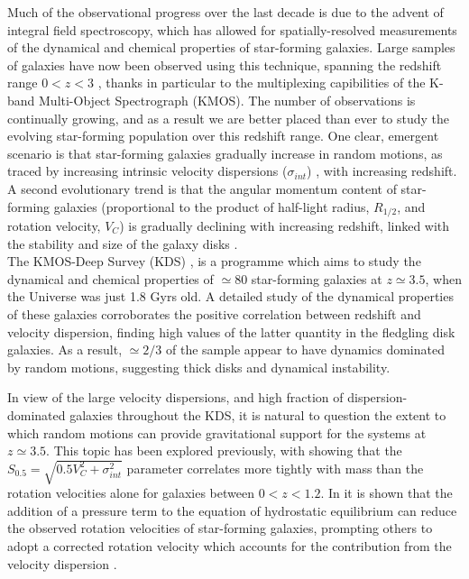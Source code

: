 \documentclass[fleqn,usenatbib]{mnras}
\begin{document}
\noindent
Much of the observational progress over the last decade is due to the advent of integral field spectroscopy, which has allowed for spatially-resolved measurements of the dynamical and chemical properties of star-forming galaxies.
Large samples of galaxies have now been observed using this technique, spanning the redshift range $0 < z < 3$ \citep[e.g.][]{Epinat2008a,ForsterSchreiber2009,Gnerucci2011,Epinat2012,Wisnioski2015,Stott2016,Swinbank2017}, thanks in particular to the multiplexing capibilities of the K-band Multi-Object Spectrograph (KMOS).
The number of observations is continually growing, and as a result we are better placed than ever to study the evolving star-forming population over this redshift range.
One clear, emergent scenario is that star-forming galaxies gradually increase in random motions, as traced by increasing intrinsic velocity dispersions ($\sigma_{int}$) \citep[e.g.][]{Wisnioski2015}, with increasing redshift.
A second evolutionary trend is that the angular momentum content of star-forming galaxies (proportional to the product of half-light radius, $R_{1/2}$, and rotation velocity, $V_{C}$) is gradually declining with increasing redshift, linked with the stability and size of the galaxy disks \citep{Obreschkow2016,Lagos2017,Harrison2017,Swinbank2017}.  \\

\noindent
The KMOS-Deep Survey (KDS) \citep{Turner2017}, is a programme which aims to study the dynamical and chemical properties of $\simeq 80$ star-forming galaxies at $z\simeq3.5$, when the Universe was just 1.8 Gyrs old.
A detailed study of the dynamical properties of these galaxies corroborates the positive correlation between redshift and velocity dispersion, finding high values of the latter quantity in the fledgling disk galaxies.
As a result, $\simeq2/3$ of the sample appear to have dynamics dominated by random motions, suggesting thick disks and dynamical instability. 

In view of the large velocity dispersions, and high fraction of dispersion-dominated galaxies throughout the KDS, it is natural to question the extent to which random motions can provide gravitational support for the systems at $z\simeq3.5$.
This topic has been explored previously, with \cite{Kassin2007} showing that the $S_{0.5} = \sqrt{0.5V_{C}^{2} + \sigma_{int}^{2}}$ parameter correlates more tightly with mass than the rotation velocities alone for galaxies between $0 < z < 1.2$.
In \cite{Burkert2010} it is shown that the addition of a pressure term to the equation of hydrostatic equilibrium can reduce the observed rotation velocities of star-forming galaxies, prompting others to adopt a corrected rotation velocity which accounts for the contribution from the velocity dispersion \citep[e.g.][]{Newman2013,Ubler2017}. \\
\end{document}
